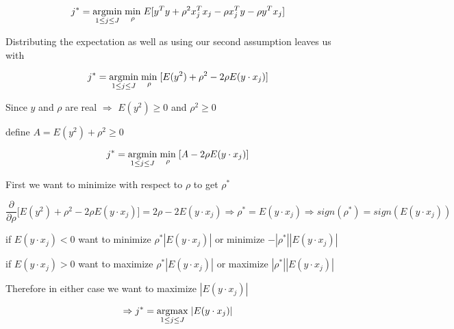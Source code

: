 \documentclass[11pt]{article}
\begin{document}
$$j^* = \underset{1 \leq j \leq J}{\operatorname{argmin}} \hspace{1mm} \underset{\rho}{\operatorname{min}} \hspace{1mm} E[y^Ty + \rho^2 x_j^T x_j - \rho x_j^T y - \rho y^T x_j]$$ 

Distributing the expectation as well as using our second assumption leaves us with

$$j^* = \underset{1 \leq j \leq J}{\operatorname{argmin}} \hspace{1mm} \underset{\rho}{\operatorname{min}} \hspace{1mm} [E(y^2) + \rho^2 - 2 \rho E(y \cdot x_j)]$$

Since $y$ and $\rho$ are real $\Rightarrow$ $E(y^2) \geq 0$ and $\rho^2 \geq 0$ 

define $A = E(y^2) + \rho^2 \geq 0$

$$j^* = \underset{1 \leq j \leq J}{\operatorname{argmin}} \hspace{1mm} \underset{\rho}{\operatorname{min}} \hspace{1mm} [A - 2 \rho E(y \cdot x_j)]$$

First we want to minimize with respect to $\rho$ to get $\rho^*$

$$\frac{\partial}{\partial \rho} \bigg[ E(y^2) + \rho^2 - 2 \rho E(y \cdot x_j) \bigg] = 2 \rho - 2 E(y \cdot x_j) \Rightarrow \rho^* = E(y \cdot x_j) \Rightarrow sign(\rho^*) = sign(E(y \cdot x_j))$$ 

if $E(y \cdot x_j) < 0$ want to minimize $\rho^* |E(y \cdot x_j)|$ or minimize $- |\rho^*| |E(y \cdot x_j)|$

if $E(y \cdot x_j) > 0$ want to maximize $\rho^* |E(y \cdot x_j)|$ or maximize $ |\rho^*| |E(y \cdot x_j)|$

Therefore in either case we want to maximize $|E(y \cdot x_j)|$

$$ \Rightarrow j^* = \underset{1 \leq j \leq J}{\operatorname{argmax}}\hspace{1mm} |E(y \cdot x_j)|$$
\end{document}
